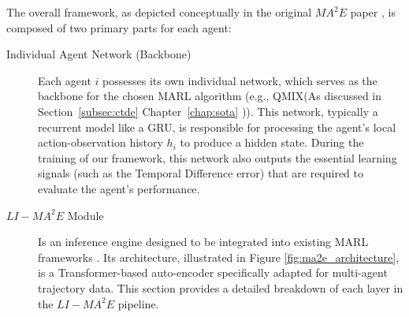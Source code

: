 The overall framework, as depicted conceptually in  the original ${MA}^2E$  paper \parencite{ma2e}, is composed of two primary parts for each agent:
\begin{description}
    \item[Individual Agent Network (Backbone)] Each agent $i$ possesses its own individual network, which serves as the backbone for the chosen MARL algorithm (e.g., QMIX\parencite{QMIX}(As discussed in Section~\ref{subsec:ctde}  Chapter~\ref{chap:sota}  )). This network, typically a recurrent model like a GRU, is responsible for processing the agent's local action-observation history $h_i$ to produce a hidden state. During the training of our framework, this network also outputs the essential learning signals (such as the Temporal Difference error) that are required to evaluate the agent's performance.
    
  \item[$LI-{MA}^2E$  Module ]  Is an inference engine designed to be integrated into existing MARL frameworks \parencite{ma2e}. Its architecture, illustrated in Figure \ref{fig:ma2e_architecture}, is a Transformer-based auto-encoder specifically adapted for multi-agent trajectory data. This section provides a detailed breakdown of each layer in the $LI-{MA}^2E$  pipeline.




\end{description}
